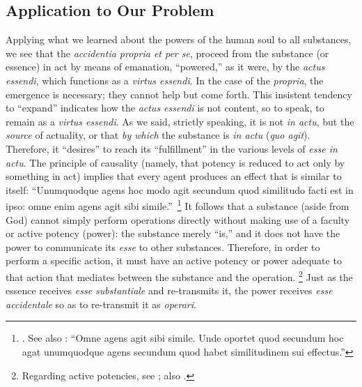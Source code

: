 \subsection{Application to Our Problem}

Applying what we learned about the powers of the human soul to all substances, we see that the \emph{accidentia propria et per se}, proceed from the substance (or essence) in act by means of emanation, “powered,” as it were, by the \emph{actus essendi}, which functions as a \emph{virtus essendi}. In the case of the \emph{propria}, the emergence is necessary; they cannot help but come forth. This insistent tendency to “expand” indicates how the \emph{actus essendi} is not content, so to speak, to remain as a \emph{virtus essendi}. As we said, strictly speaking, it is not \emph{in actu}, but the \emph{source} of actuality, or that \emph{by which} the substance is \emph{in actu} (\emph{quo agit}). Therefore, it “desires” to reach its “fulfillment” in the various levels of \emph{esse in actu}. The principle of causality (namely, that potency is reduced to act only by something in act) implies that every agent produces an effect that is similar to itself: “Unumquodque agens hoc modo agit secundum quod similitudo facti est in ipso: omne enim agens agit sibi simile.”\,%
%
\footnote{\Cite[II, cap.~23, n.~4 (Marietti n.~992)]{st:contragent}. See also \cite[II, cap.~24, n.~3 (Marietti n.~1004)]{st:contragent}: “Omne agens agit sibi simile. Unde oportet quod secundum hoc agat unumquodque agens secundum quod habet similitudinem sui effectus.”}
%
It follows that a substance (aside from God) cannot simply perform operations directly without making use of a faculty or active potency (power): the substance merely “is,” and it does not have the power to communicate its \emph{esse} to other substances. Therefore, in order to perform a specific action, it must have an active potency or power adequate to that action that mediates between the substance and the operation.%
%
\footnote{Regarding active potencies, see \cite[244–246]{definance:etre-et-agir}; also \cite[212–219]{izquierdo:vita}.}
%
Just as the essence receives \emph{esse substantiale} and re-transmits it, the power receives \emph{esse accidentale} so as to re-transmit it as   \emph{operari}.

